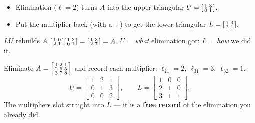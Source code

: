 \documentclass[aspectratio=169, 11pt]{beamer}
\begin{document}
\begin{frame}[t, plain]
  \begin{itemize}
    \setlength{\itemsep}{5pt}
    \item Elimination ($\ell=2$) turns $A$ into the upper-triangular $U=\begin{bsmallmatrix} 1&3\\0&1 \end{bsmallmatrix}$.
    \item Put the multiplier back (with a $+$) to get the lower-triangular $L=\begin{bsmallmatrix} 1&0\\2&1 \end{bsmallmatrix}$.
  \end{itemize}
  \begin{block}{$LU$ rebuilds $A$}
    $\begin{bsmallmatrix} 1&0\\2&1 \end{bsmallmatrix}\begin{bsmallmatrix} 1&3\\0&1 \end{bsmallmatrix} = \begin{bsmallmatrix} 1&3\\2&7 \end{bsmallmatrix} = A.$ \quad
    $U$ = \emph{what} elimination got; $L$ = \emph{how} we did it.
  \end{block}
\end{frame}

\begin{frame}[t, plain]
  Eliminate $A=\begin{bsmallmatrix} 1&2&1\\2&5&5\\3&7&8 \end{bsmallmatrix}$ and record each multiplier:
  \; $\ell_{21}=2,\ \ell_{31}=3,\ \ell_{32}=1$.
  \[
    U=\begin{bmatrix} 1&2&1\\0&1&3\\0&0&2 \end{bmatrix},
    \qquad
    L=\begin{bmatrix} 1&0&0\\ 2&1&0\\ 3&1&1 \end{bmatrix}.
  \]
  The multipliers slot straight into $L$ --- it is a \textbf{free record} of the elimination you already did.
\end{frame}
\end{document}

